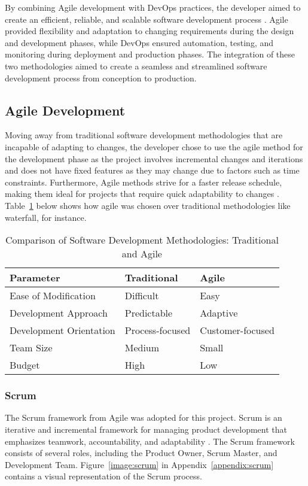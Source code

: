 By combining Agile development with DevOps practices, the developer aimed to create an efficient, reliable, and scalable software development process \cite{hlrf}. Agile provided flexibility and adaptation to changing requirements during the design and development phases, while DevOps ensured automation, testing, and monitoring during deployment and production phases. The integration of these two methodologies aimed to create a seamless and streamlined software development process from conception to production.

\subsection{Agile Development}
Moving away from traditional software development methodologies that are incapable of adapting to changes, the developer chose to use the agile method for the development phase as the project involves incremental changes and iterations and does not have fixed features as they may change due to factors such as time constraints. Furthermore, Agile methods strive for a faster release schedule, making them ideal for projects that require quick adaptability to changes \cite{aaa, hlrf, dragos, koch}. Table~\ref{tab:swmethod} below shows how agile was chosen over traditional methodologies like waterfall, for instance.

\begin{table}[ht]
    \centering
\begin{tabular}{|p{5cm}||p{3.5cm}||p{3.5cm}|}
\hline
\textbf{Parameter} & \textbf{Traditional} & \textbf{Agile} \\
\hline \hline
Ease of Modification  & Difficult & Easy \\
\hline
Development Approach  & Predictable  & Adaptive \\
\hline
Development Orientation  & Process-focused & Customer-focused \\
\hline
Team Size & Medium & Small \\
\hline
Budget & High & Low \\
\hline
\end{tabular}
\linebreak
    \caption{Comparison of Software Development Methodologies: Traditional and Agile \cite{aaa}}
    \label{tab:swmethod}
\end{table}

\subsubsection{Scrum}
The Scrum framework from Agile was adopted for this project. Scrum is an iterative and incremental framework for managing product development that emphasizes teamwork, accountability, and adaptability \cite{aaa, koch}. The Scrum framework consists of several roles, including the Product Owner, Scrum Master, and Development Team. Figure~\ref{image:scrum} in Appendix~\ref{appendix:scrum} contains a visual representation of the Scrum process.

